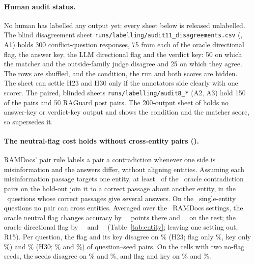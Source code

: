 \paragraph{Human audit status.} No human has labelled any output yet; every sheet below is released unlabelled. The
blind disagreement sheet \texttt{runs/labelling/audit11\_disagreements.csv} (, A1) holds 300 conflict-question
responses, 75 from each of the oracle directional flag, the answer key, the LLM directional flag and the verdict key:
50 on which the matcher and the outside-family judge disagree and 25 on which they agree. The rows are shuffled, and
the condition, the run and both scores are hidden. The sheet can settle H23 and H30 only if the annotators side
clearly with one scorer. The paired, blinded sheets \texttt{runs/labelling/audit8\_*} (A2, A3) hold 150 of the
 pairs and 50 RAGuard post pairs. The 200-output sheet of  holds no answer-key or verdict-key
output and shows the condition and the matcher score, so  supersedes it.


\paragraph{The neutral-flag cost holds without cross-entity pairs ().} RAMDocs' pair rule labels a pair a
contradiction whenever one side is misinformation and the answers differ, without aligning entities. Assuming each
misinformation passage targets one entity, at least \pairCrossLb\ of the \pairContraN\ oracle contradiction pairs on the
hold-out join it to a correct passage about another entity, in the \pairMultiN\ questions whose correct passages give
several answers. On the \pairSingleN\ single-entity questions no pair can cross entities. Averaged over the \entNeuK\
RAMDocs settings, the oracle neutral flag changes accuracy by \entNeuSingle\ \entNeuSingleCI\ points there and
\entNeuMulti\ \entNeuMultiCI\ on the rest; the oracle directional flag by \entDirSingle\ \entDirSingleCI\ and
\entDirMulti\ \entDirMultiCI\ (Table~\ref{tab:entity}; leaving one setting out, R15). Per question, the flag and its
key disagree on \agrTwentyThreeDis\% (H23; flag only \agrTwentyThreeFlagOnly\%,
key only \agrTwentyThreeKeyOnly\%) and \agrThirtyDis\% (H30; \agrThirtyFlagOnly\% and \agrThirtyKeyOnly\%) of
question--seed pairs. On the cells with two no-flag seeds, the seeds disagree on \agrTwentyThreeNull\% and \agrThirtyNull\%,
and flag and key on \agrTwentyThreeDisMatched\% and \agrThirtyDisMatched\%.

